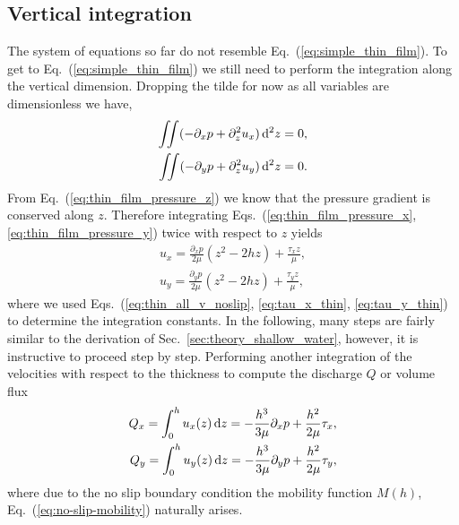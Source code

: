\subsection{Vertical integration}
\label{subsec:thin_film_int}
The system of equations so far do not resemble Eq.~(\ref{eq:simple_thin_film}).
To get to Eq.~(\ref{eq:simple_thin_film}) we still need to perform the integration along the vertical dimension.
Dropping the tilde for now as all variables are dimensionless we have, 
\begin{align}\label{eq:int_vels_thin}
    \iint (-\partial_x p + \partial_z^2 u_x ) \mathop{}\!\mathrm{d}^2 z = 0,  \\
    \iint (-\partial_y p + \partial_z^2 u_y ) \mathop{}\!\mathrm{d}^2 z = 0. 
\end{align}
From Eq.~(\ref{eq:thin_film_pressure_z}) we know that the pressure gradient is conserved along $z$. 
Therefore integrating Eqs.~(\ref{eq:thin_film_pressure_x}, \ref{eq:thin_film_pressure_y}) twice with respect to $z$ yields
\begin{align}
    u_x = \frac{\partial_x p}{2\mu}(z^2 - 2hz) + \frac{\tau_x z}{\mu}, \label{eq:vel_x_int_thin}\\
    u_y = \frac{\partial_y p}{2\mu}(z^2 - 2hz) + \frac{\tau_y z}{\mu}, \label{eq:vel_y_int_thin}
\end{align}
where we used Eqs.~(\ref{eq:thin_all_v_noslip}, \ref{eq:tau_x_thin}, \ref{eq:tau_y_thin}) to determine the integration constants.
In the following, many steps are fairly similar to the derivation of Sec.~\ref{sec:theory_shallow_water}, however, it is instructive to proceed step by step.
Performing another integration of the velocities with respect to the thickness to compute the discharge $Q$ or volume flux 
\begin{align}
    Q_x = \int_0^h u_x(z)\mathop{}\!\mathrm{d} z = -\frac{h^3}{3\mu}\partial_x p + \frac{h^2}{2\mu} \tau_x, \label{eq:discharge_thin_x} \\
    Q_y = \int_0^h u_y(z)\mathop{}\!\mathrm{d} z = -\frac{h^3}{3\mu}\partial_y p + \frac{h^2}{2\mu} \tau_y, \label{eq:discharge_thin_y}
\end{align}
where due to the no slip boundary condition the mobility function $M(h)$, Eq.~(\ref{eq:no-slip-mobility}) naturally arises.

